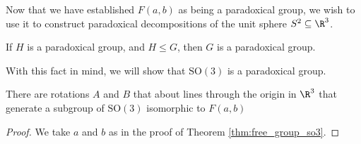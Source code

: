 Now that we have established $F(a,b)$ as being a paradoxical group, we wish to use it to construct paradoxical decompositions of the unit sphere $S^2 \subseteq \R^3$.
\begin{fact}
  If $H$ is a paradoxical group, and $H\leq G$, then $G$ is a paradoxical group.
\end{fact}
With this fact in mind, we will show that $\text{SO}(3)$ is a paradoxical group.
\begin{theorem}
  There are rotations $A$ and $B$ that about lines through the origin in $\R^3$ that generate a subgroup of $\text{SO}(3)$ isomorphic to $F(a,b)$
\end{theorem}
\begin{proof}
  We take $a$ and $b$ as in the proof of Theorem \ref{thm:free_group_so3}.
%
%

\end{proof}
